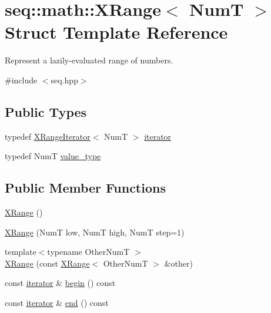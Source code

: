 \hypertarget{structseq_1_1math_1_1_x_range}{\section{seq\-:\-:math\-:\-:X\-Range$<$ Num\-T $>$ Struct Template Reference}
\label{structseq_1_1math_1_1_x_range}
}


Represent a lazily-\/evaluated range of numbers.  




{\ttfamily \#include $<$seq.\-hpp$>$}

\subsection*{Public Types}
\begin{DoxyCompactItemize}
\item 
typedef \hyperlink{classseq_1_1math_1_1_x_range_iterator}{X\-Range\-Iterator}$<$ Num\-T $>$ \hyperlink{structseq_1_1math_1_1_x_range_abafa12c8fe329c911982d7437e7b0281}{iterator}
\item 
typedef Num\-T \hyperlink{structseq_1_1math_1_1_x_range_adfd6ff29384303c71cf33c903e099e3c}{value\-\_\-type}
\end{DoxyCompactItemize}
\subsection*{Public Member Functions}
\begin{DoxyCompactItemize}
\item 
\hyperlink{structseq_1_1math_1_1_x_range_aa3b9c544a4c740bc0a9dee803bbde3a8}{X\-Range} ()
\item 
\hyperlink{structseq_1_1math_1_1_x_range_ab96ca4e1cb77c57b49bee3071b027f4b}{X\-Range} (Num\-T low, Num\-T high, Num\-T step=1)
\item 
{\footnotesize template$<$typename Other\-Num\-T $>$ }\\\hyperlink{structseq_1_1math_1_1_x_range_aec92a32c748822f6aeb1935e045f4eb3}{X\-Range} (const \hyperlink{structseq_1_1math_1_1_x_range}{X\-Range}$<$ Other\-Num\-T $>$ \&other)
\item 
const \hyperlink{structseq_1_1math_1_1_x_range_abafa12c8fe329c911982d7437e7b0281}{iterator} \& \hyperlink{structseq_1_1math_1_1_x_range_a231541cb2a2f68811f3bb96ea14689bf}{begin} () const 
\item 
const \hyperlink{structseq_1_1math_1_1_x_range_abafa12c8fe329c911982d7437e7b0281}{iterator} \& \hyperlink{structseq_1_1math_1_1_x_range_afe800d3e48413221a54ff54bfcf14206}{end} () const 
\end{DoxyCompactItemize}
